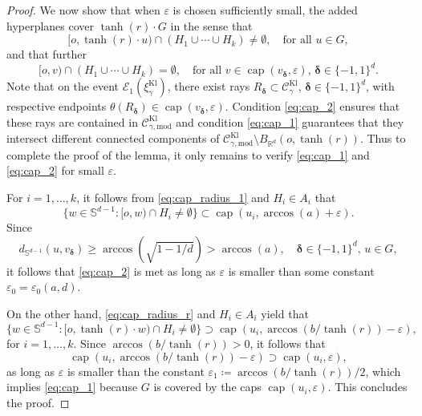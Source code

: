 \documentclass[12pt,a4paper]{article}
\theoremstyle{definition}
\newcommand{\R}{\mathbb{R}}
\DeclareMathOperator{\capop}{cap}
\begin{document}
\begin{proof}
    We now show that when $\varepsilon$ is chosen sufficiently small, the added hyperplanes cover $\tanh(r)\cdot G$ in the sense that
    \begin{equation}\label{eq:cap_1}
        [o,\tanh(r)\cdot u) \cap (H_1 \cup \cdots\cup H_k) \neq \emptyset, \quad \text{for all $u \in G$},
    \end{equation}
    and that further
    \begin{equation}\label{eq:cap_2}
        [o,v) \cap (H_1 \cup \cdots\cup H_k) = \emptyset, \quad \text{for all $v \in \capop(v_{\boldsymbol\delta},\varepsilon)$},\, \boldsymbol\delta\in \{-1,1\}^d.
    \end{equation}
    Note that on the event $\mathcal{E}_1(\xi_\gamma^\text{Kl})$, there exist rays $R_{\boldsymbol\delta} \subset \mathcal{C}_\gamma^\text{Kl}$, $\boldsymbol\delta \in \{-1,1\}^d$, with respective endpoints $\theta(R_{\boldsymbol\delta}) \in \capop(v_{\boldsymbol\delta},\varepsilon)$.
    Condition \eqref{eq:cap_2} ensures that these rays are contained in $\mathcal{C}_{\gamma,\text{mod}}^\text{Kl}$ and condition \eqref{eq:cap_1} guarantees that they intersect different connected components of $\mathcal{C}_{\gamma,\text{mod}}^\text{Kl} \setminus B_{\R^d}(o,\tanh(r))$. Thus to complete the proof of the lemma, it only remains to verify \eqref{eq:cap_1} and \eqref{eq:cap_2} for small $\varepsilon$.
    
    For $i = 1,\ldots,k$, it follows from \eqref{eq:cap_radius_1} and $H_i \in A_i$ that
    \[ \{w \in \mathbb{S}^{d-1} \colon [o,w) \cap H_i \neq \emptyset\} 
    \subset \capop(u_i,\arccos(a)+\varepsilon). \]
    Since
    \[ d_{\mathbb{S}^{d-1}}(u,v_{\boldsymbol\delta}) \geq \arccos(\sqrt{1-1/d}) > \arccos(a), \quad \boldsymbol\delta \in \{-1,1\}^d,\, u \in G, \]
    it follows that \eqref{eq:cap_2} is met as long as $\varepsilon$ is smaller than some constant $\varepsilon_0 = \varepsilon_0(a,d)$.

    On the other hand, \eqref{eq:cap_radius_r} and $H_i \in A_i$ yield that
    \[ \{w \in \mathbb{S}^{d-1} \colon [o,\tanh(r)\cdot w) \cap H_i \neq \emptyset\} \supset \capop(u_i,\arccos({b}/{\tanh(r)})-\varepsilon), \]
    for $i=1,\ldots,k$.
    Since $\arccos(b/\tanh(r))>0$, it follows that
    \[ \capop(u_i,\arccos({b}/{\tanh(r)})-\varepsilon) \supset \capop(u_i,\varepsilon), \]
    as long as $\varepsilon$ is smaller than the constant $\varepsilon_1 \coloneqq \arccos(b/\tanh(r))/2$, which implies \eqref{eq:cap_1} because $G$ is covered by the caps $\capop(u_i,\varepsilon)$.
    This concludes the proof.
\end{proof}
\end{document}
